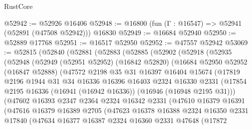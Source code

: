 \begin{lexlean}{RustCore}
\begin{coremodule}
@52942 := @52926 @16406
@52948 := @16800 (fun (Γ : @16547) => @52941 (@52891 (@47508 @52942))) @16830
@52949 := @16684 @52940
@52950 := @52889 @17768
@52951 := @16517 @52950
@52952 := @47557 @52942
@53069 := @52815
    (@52840
      (@52881
        (@52883
          (@52885
            (@52902
              (@52918
                (@52935
                  (@52948
                    (@52949
                      (@52951 @52952)
                      (@16842 @52820)
                      (@16684
                        @52950
                        @52952
                        (@16847 @52888)
                        (@47572
                          @2198
                          @35
                          @31
                          @16397
                          @16404
                          @15674
                          (@17819
                            @2196
                            @1944
                            @31
                            @34
                            @16336
                            @16396
                            @16403
                            @2324
                            @16330
                            @2331
                            (@17854
                              @2195
                              @16336
                              (@16941 (@16942 @16336))
                              (@16946 (@16948 @2195 @31)))
                            (@47602
                              @16393
                              @2347
                              @2364
                              @2324
                              @16342
                              @2331
                              (@47610
                                @16379
                                @16391
                                (@47616
                                  @16379
                                  @16389
                                  @2705
                                  (@47623
                                    @16378
                                    @16388
                                    @2324
                                    @16350
                                    @2331
                                    @17840
                                    (@47634
                                      @16377
                                      @16387
                                      @2324
                                      @16360
                                      @2331
                                      @47648
                                      (@17872

\end{coremodule}
\end{lexlean}
